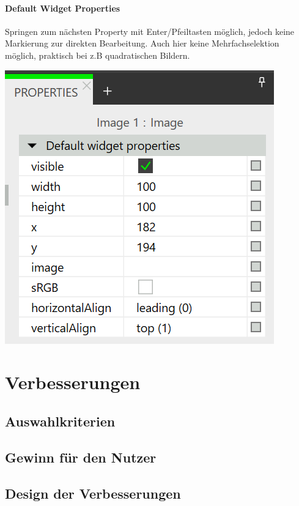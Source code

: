 \paragraph{Default Widget Properties}
Springen zum nächsten Property mit Enter/Pfeiltasten möglich, jedoch keine Markierung zur direkten Bearbeitung.
Auch hier keine Mehrfachselektion möglich, praktisch bei z.B quadratischen Bildern.
\begin{center}
  \includegraphics[scale=0.8]{figures/DefaultProperties.png}
  \label{fig:DefaultProperties}
\end{center}


\section{Verbesserungen}
\subsection{Auswahlkriterien}
\subsection{Gewinn für den Nutzer}
\subsection{Design der Verbesserungen}

